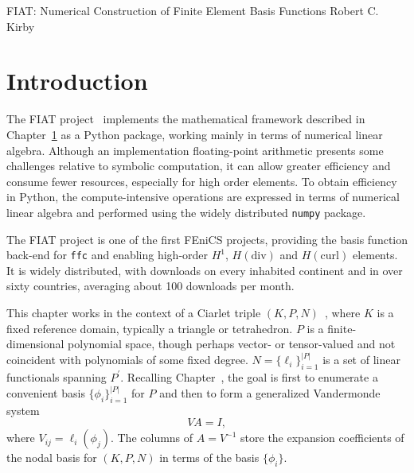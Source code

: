               {FIAT: Numerical Construction of Finite Element Basis Functions}
              {Robert C. Kirby}

\section{Introduction}
The FIAT project~\cite{Kir04,Kir06} implements the mathematical framework
described in Chapter~\ref{} as a Python package, working mainly in
terms of numerical linear algebra.  Although an implementation
floating-point arithmetic presents some challenges relative to
symbolic computation, it can allow greater efficiency and consume
fewer resources, especially for high order
elements.  To obtain efficiency in Python, the compute-intensive
operations are expressed in terms of numerical linear algebra and
performed using the widely distributed \texttt{numpy} package.

The FIAT project is one of the first FEniCS projects, providing the
basis function back-end for \texttt{ffc} and enabling high-order 
\( H^1 \), 
\( H(\mathrm{div}) \) and \( H(\mathrm{curl}) \) elements.  It is widely
distributed, with downloads on every inhabited continent and in over
sixty countries, averaging  about 100 downloads per month. 


This chapter works in the context of a Ciarlet triple \( (K,P,N) \)~\cite{Cia78},
where \( K \) is a fixed reference domain, typically a triangle or
tetrahedron.  \( P \) is a finite-dimensional polynomial space, though
perhaps vector- or tensor-valued and not coincident with polynomials
of some fixed degree.  \( N = \{ \ell_i \}_{i=1}^{|P|} \) is a set of linear functionals spanning
\( P^\prime \).  Recalling Chapter~\cite{}, the goal is first to
enumerate a convenient basis \( \{ \phi_i \}_{i=1}^{|P|} \) for \( P
\) and then to form a generalized Vandermonde system
\[
V A = I,
\]
where \( V_{ij} = \ell_i( \phi_j) \).
The columns of \( A = V^{-1} \) store the expansion coefficients of
the nodal basis for \( (K,P,N) \) in terms of the basis \( \{ \phi_i
\} \).


